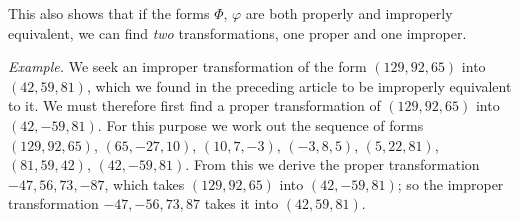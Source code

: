 This also shows that if the forms $\Phi$, $\varphi$ are both properly and improperly equivalent, we can find \textit{two} transformations, one proper and one improper.

\textit{Example.} We seek an improper transformation of the form $(129,92,65)$ into $(42,59,81)$, which we found in the preceding article to be improperly equivalent to it. We must therefore first find a proper transformation of $(129,92,65)$ into $(42,-59,81)$. For this purpose we work out the sequence of forms $(129,92,65)$, $(65,-27,10)$, $(10,7,-3)$, $(-3,8,5)$, $(5,22,81)$, $(81,59,42)$, $(42,-59,81)$. From this we derive the proper transformation $-47,56,73,-87$, which takes $(129,92,65)$ into $(42,-59,81)$; so the improper transformation $-47,\allowbreak-56,\allowbreak73,\allowbreak87$ takes it into $(42,59,81)$.
